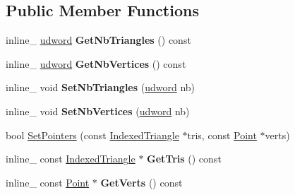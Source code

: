 \subsection*{Public Member Functions}
\begin{DoxyCompactItemize}
\item 
inline\+\_\+ \hyperlink{IceTypes_8h_a44c6f1920ba5551225fb534f9d1a1733}{udword} {\bfseries Get\+Nb\+Triangles} () const \hypertarget{classMeshInterface_a166fa0dd2932406c1662f11308d143f0}{}\label{classMeshInterface_a166fa0dd2932406c1662f11308d143f0}

\item 
inline\+\_\+ \hyperlink{IceTypes_8h_a44c6f1920ba5551225fb534f9d1a1733}{udword} {\bfseries Get\+Nb\+Vertices} () const \hypertarget{classMeshInterface_a9f4e57faca3d41acb1e595f221b71769}{}\label{classMeshInterface_a9f4e57faca3d41acb1e595f221b71769}

\item 
inline\+\_\+ void {\bfseries Set\+Nb\+Triangles} (\hyperlink{IceTypes_8h_a44c6f1920ba5551225fb534f9d1a1733}{udword} nb)\hypertarget{classMeshInterface_abfd3284e03432fe0fefe895b79df6cdf}{}\label{classMeshInterface_abfd3284e03432fe0fefe895b79df6cdf}

\item 
inline\+\_\+ void {\bfseries Set\+Nb\+Vertices} (\hyperlink{IceTypes_8h_a44c6f1920ba5551225fb534f9d1a1733}{udword} nb)\hypertarget{classMeshInterface_a5f9a5aae4efcd8d21a174fedbdcbfcf7}{}\label{classMeshInterface_a5f9a5aae4efcd8d21a174fedbdcbfcf7}

\item 
bool \hyperlink{classMeshInterface_a4810ebe4cad5b7ff08ca26187fa1c301}{Set\+Pointers} (const \hyperlink{classIndexedTriangle}{Indexed\+Triangle} $\ast$tris, const \hyperlink{classPoint}{Point} $\ast$verts)
\item 
inline\+\_\+ const \hyperlink{classIndexedTriangle}{Indexed\+Triangle} $\ast$ {\bfseries Get\+Tris} () const \hypertarget{classMeshInterface_a5c3594184da578eee7b7163453bf0269}{}\label{classMeshInterface_a5c3594184da578eee7b7163453bf0269}

\item 
inline\+\_\+ const \hyperlink{classPoint}{Point} $\ast$ {\bfseries Get\+Verts} () const \hypertarget{classMeshInterface_ac2ba230f02dbec05b265c31b1f76bed3}{}\label{classMeshInterface_ac2ba230f02dbec05b265c31b1f76bed3}


\end{DoxyCompactItemize}
